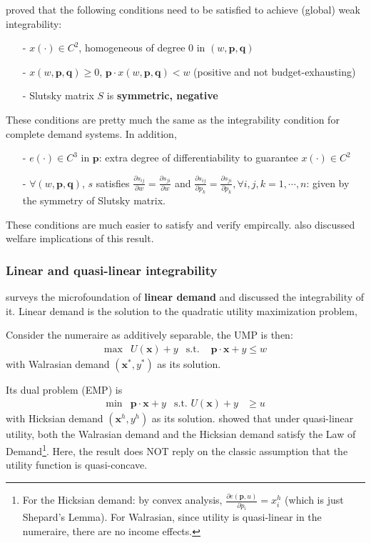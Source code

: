 \citeauthor*{lafrance1989dual} proved that the following conditions need to be satisfied to achieve (global) weak integrability:
\begin{enumerate}
    \item[-] $x(\cdot)\in C^2$, homogeneous of degree 0 in $(w,\mathbf{p},\mathbf{q})$
    \item[-] $x(w,\mathbf{p},\mathbf{q})\geq 0$, $\mathbf{p}\cdot x(w,\mathbf{p},\mathbf{q})<w$ (positive and not budget-exhausting)
    \item[-] Slutsky matrix $S$ is \textbf{symmetric, negative }
\end{enumerate} 
These conditions are pretty much the same as the integrability condition for complete demand systems. In addition,
\begin{enumerate}
    \item[-] $e(\cdot)\in C^3$ in $\mathbf{p}$: extra degree of differentiability to guarantee $x(\cdot)\in C^2$
    \item[-] $\forall (w,\mathbf{p},\mathbf{q})$, $s$ satisfies $\frac{\partial s_{ij}}{\partial w}=\frac{\partial s_{ji}}{\partial w}$ and $\frac{\partial s_{ij}}{\partial p_k}=\frac{\partial s_{ji}}{\partial p_k},\forall i,j,k=1,\cdots, n$: given by the symmetry of Slutsky matrix.
\end{enumerate}
These conditions are much easier to satisfy and verify empircally. \citeauthor*{lafrance1989dual} also discussed welfare implications of this result.

\subsubsection*{Linear and quasi-linear integrability}

\citet*{amir2017microeconomic} surveys the microfoundation of \textbf{linear demand} and discussed the integrability of it. Linear demand is the solution to the quadratic utility maximization problem, 

Consider the numeraire as additively separable, the UMP is then:
\begin{align*}
    \max & U(\mathbf{x})+y & \text{s.t. }&\mathbf{p}\cdot\mathbf{x}+y\leq w
\end{align*}
with Walrasian demand $(\mathbf{x}^*,y^*)$ as its solution. 

Its dual problem (EMP) is 
\begin{align*}
    \min & \mathbf{p}\cdot\mathbf{x}+y & \text{s.t. }U(\mathbf{x})+y&\geq u
\end{align*}
with Hicksian demand $(\mathbf{x}^h,y^h)$ as its solution.
\citeauthor*{amir2017microeconomic} showed that under quasi-linear utility, both the Walrasian demand and the Hicksian demand satisfy the Law of Demand\footnote{For the Hicksian demand: by convex analysis, $\frac{\partial e(\mathbf{p},u)}{\partial p_i}=x^h_i$ (which is just Shepard's Lemma). For Walrasian, since utility is quasi-linear in the numeraire, there are no income effects.}. Here, the result does NOT reply on the classic assumption that the utility function is quasi-concave.


